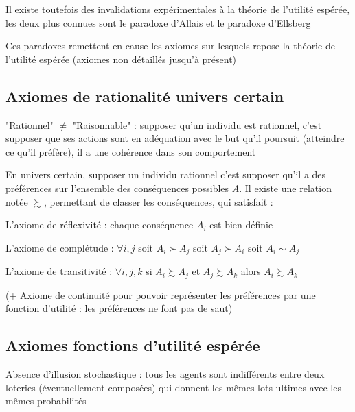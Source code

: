 \documentclass[a4paper, 12pt]{report}
\begin{document}
Il existe toutefois des invalidations expérimentales à la théorie de l'utilité espérée, les deux plus connues sont le paradoxe d'Allais et le paradoxe d'Ellsberg

Ces paradoxes remettent en cause les axiomes sur lesquels repose la théorie de l'utilité espérée (axiomes non détaillés jusqu'à présent)

\subsection{Axiomes de rationalité univers certain}

"Rationnel" $\neq$ "Raisonnable" : supposer qu'un individu est rationnel, c'est supposer que ses actions sont en adéquation avec le but qu'il poursuit (atteindre ce qu'il préfère), il a une cohérence dans son comportement

En univers certain, supposer un individu rationnel c'est supposer qu'il a des préférences sur l'ensemble des conséquences possibles $A$. Il existe une relation notée $\succsim$, permettant de classer les conséquences, qui satisfait :

L'axiome de réflexivité : chaque conséquence $A_i$ est bien définie

L'axiome de complétude : $\forall i,j $ soit $A_i\succ A_j$ soit $A_j\succ A_i$ soit $A_i \sim A_j$

L'axiome de transitivité : $\forall i,j,k $ si $A_i\succsim A_j$ et $A_j\succsim A_k$ alors $A_i\succsim A_k$

(+ Axiome de continuité pour pouvoir représenter les préférences
par une fonction d'utilité : les préférences ne font pas de saut)

\subsection{Axiomes fonctions d'utilité espérée}

Absence d'illusion stochastique : tous les agents sont indifférents entre deux loteries (éventuellement composées) qui donnent les mêmes lots ultimes avec les mêmes probabilités
\end{document}
